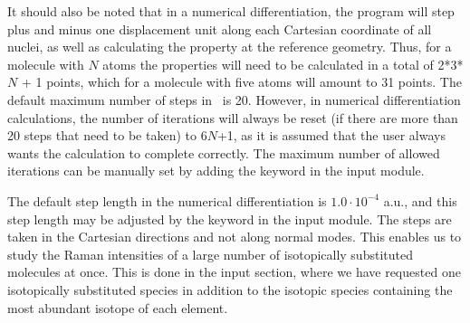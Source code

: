 It should also be noted that  in a numerical
differentiation, the
program will
step plus and minus one displacement unit along each Cartesian coordinate
of all nuclei, as well as calculating the property at the reference
geometry. Thus, for a molecule with $N$ atoms the properties will need
to be calculated in a total of 2*3*$N$ + 1 points, which for a 
molecule with five atoms will amount to 31 points. The default maximum number of
steps in \siraba\ is 20. However, in numerical differentiation
calculations, the number of iterations will always be reset (if there
are more than 20 steps that need to be taken) to 6$N$+1, as it is
assumed that the user always wants the calculation to complete
correctly. The maximum number of allowed iterations can be manually set by adding the keyword
 in the  input module.

The default step length in the numerical
differentiation is $1.0\cdot 10^{-4}$
a.u., and this step length may be adjusted by the keyword
 in the  input module. The steps are taken
in the Cartesian directions and
not along normal modes. This enables us to study the Raman intensities
of a large number of isotopically substituted molecules at once. This
is done in the  input section, where we
have requested one isotopically substituted species in addition to the
isotopic species containing the most abundant isotope of each element.
